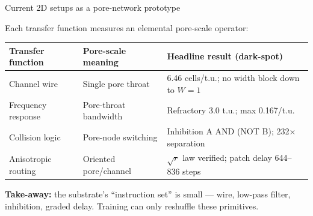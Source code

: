 \documentclass[aspectratio=169,11pt]{beamer}
\begin{document}
\begin{frame}{Current 2D setups as a pore-network prototype}

Each transfer function measures an elemental pore-scale operator:

\vspace{0.3cm}
\begin{table}
\centering
\footnotesize
\begin{tabular}{p{3.0cm}p{4.5cm}p{5.5cm}}
\toprule
\textbf{Transfer function} & \textbf{Pore-scale meaning} & \textbf{Headline result (dark-spot)} \\
\midrule
Channel wire & Single pore throat & 6.46 cells/t.u.; no width block down to $W=1$ \\
Frequency response & Pore-throat bandwidth & Refractory 3.0 t.u.; max 0.167/t.u. \\
Collision logic & Pore-node switching & Inhibition A AND (NOT B); 232$\times$ separation \\
Anisotropic routing & Oriented pore/channel & $\sqrt{r}$ law verified; patch delay 644--836 steps \\
\bottomrule
\end{tabular}
\end{table}

\vspace{0.3cm}
\textbf{Take-away:} the substrate's ``instruction set'' is small --- wire, low-pass filter, inhibition, graded delay. Training can only reshuffle these primitives.

\end{frame}
\end{document}
